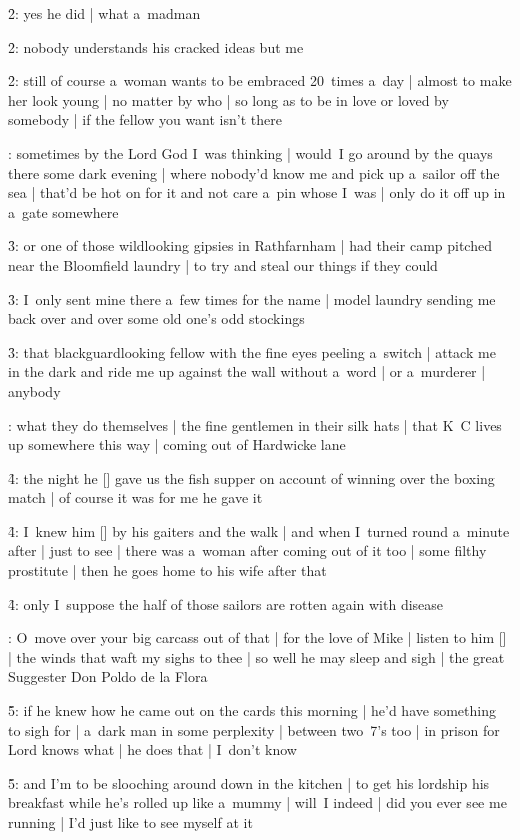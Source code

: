 \f2:
yes he did |
what a~madman

\f2:
nobody understands his cracked ideas but me

\f2:
still of course a~woman wants to be embraced 20~times a~day |
almost to make her look young |
no matter by who |
so long as to be in love or loved by somebody |
if the fellow you want isn't there

:
sometimes by the Lord God I~was thinking |
would~I go around by the quays there some dark evening |
where nobody'd know me and pick up a~sailor off the sea |
that'd be hot on for it and not care a~pin whose I~was |
only do it off up in a~gate somewhere

\f3:
or one of those wildlooking gipsies in Rathfarnham |
had their camp pitched near the Bloomfield laundry |
to try and steal our things if they could

\f3:
I~only sent mine there a~few times for the name |
model laundry sending me back over and over some old one's odd stockings

\f3:
that blackguardlooking fellow with the fine eyes peeling a~switch |
attack me in the dark and ride me up against the wall without a~word |
or a~murderer |
anybody

:
what they do themselves |
the fine gentlemen in their silk hats |
that K~C lives up somewhere this way |
coming out of Hardwicke lane

\f4:
the night he [\boylan] gave us the fish supper
on account of winning over the boxing match |
of course it was for me he gave it

\f4:
I~knew him [\kc] by his gaiters and the walk |
and when I~turned round a~minute after |
just to see |
there was a~woman after coming out of it too |
some filthy prostitute |
then he goes home to his wife after that

\f4:
only I~suppose the half of those sailors are rotten again with disease

:
O~move over your big carcass out of that |
for the love of Mike |
listen to him [\bloom] |
the winds that waft my sighs to thee |
so well he may sleep and sigh |
the great Suggester Don Poldo de la Flora

\f5:
if he knew how he came out on the cards this morning |
he'd have something to sigh for |
a~dark man in some perplexity |
between two~7's too |
in prison
for Lord knows what |
he does that |
I~don't know

\f5:
and I'm to be slooching around down in the kitchen |
to get his lordship his breakfast while he's rolled up like a~mummy |
will~I indeed |
did you ever see me running |
I'd just like to see myself at it

